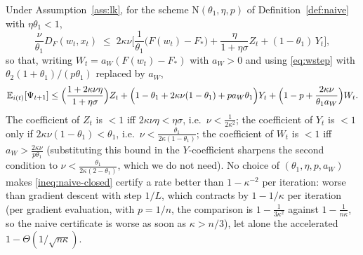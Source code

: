 \begin{proposition}\label{prop:naive-kappa}
Under Assumption~\ref{ass:lk}, for the scheme $\mathrm N(\theta_1,\eta,p)$ of Definition~\ref{def:naive} with $\eta\theta_1<1$,
\begin{equation}\label{ineq:naive-kappa}
\frac\nu{\theta_1}D_F(w_t,x_t)\;\le\;2\kappa\nu\Big[\frac1{\theta_1}\big(F(w_t)-F_\ast\big)+\frac{\eta}{1+\eta\sigma}Z_t+(1-\theta_1)\,Y_t\Big],
\end{equation}
so that, writing $W_t=a_W(F(w_t)-F_\ast)$ with $a_W>0$ and using \eqref{eq:wstep} with $\theta_2(1+\theta_1)/(p\theta_1)$ replaced by $a_W$,
\begin{equation}\label{ineq:naive-closed}
\mathbb{E}_{i(t)}[\Psi_{t+1}]\le\Big(\frac{1+2\kappa\nu\eta}{1+\eta\sigma}\Big)Z_t+\Big(1-\theta_1+2\kappa\nu(1-\theta_1)+pa_W\theta_1\Big)Y_t+\Big(1-p+\frac{2\kappa\nu}{\theta_1a_W}\Big)W_t .
\end{equation}
The coefficient of $Z_t$ is $<1$ iff $2\kappa\nu\eta<\eta\sigma$, i.e.\ $\nu<\frac1{2\kappa^2}$; the coefficient of $Y_t$ is $<1$ only if $2\kappa\nu(1-\theta_1)<\theta_1$, i.e.\ $\nu<\frac{\theta_1}{2\kappa(1-\theta_1)}$; the coefficient of $W_t$ is $<1$ iff $a_W>\frac{2\kappa\nu}{p\theta_1}$ (substituting this bound in the $Y$-coefficient sharpens the second condition to $\nu<\frac{\theta_1}{2\kappa(2-\theta_1)}$, which we do not need). No choice of $(\theta_1,\eta,p,a_W)$ makes \eqref{ineq:naive-closed} certify a rate better than $1-\kappa^{-2}$ per iteration: worse than gradient descent with step $1/L$, which contracts by $1-1/\kappa$ per iteration (per gradient evaluation, with $p=1/n$, the comparison is $1-\frac1{3\kappa^2}$ against $1-\frac1{n\kappa}$, so the naive certificate is worse as soon as $\kappa>n/3$), let alone the accelerated $1-\Theta(1/\sqrt{n\kappa})$.
\end{proposition}

